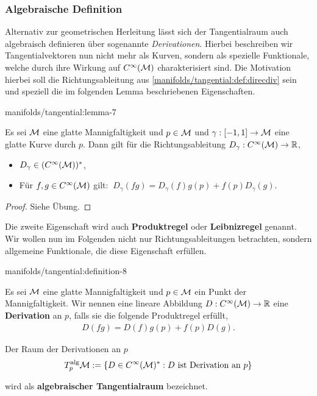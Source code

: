 \subsubsection{Algebraische Definition}
\label{\detokenize{manifolds/tangential:algebraische-definition}}
\par
Alternativ zur geometrischen Herleitung lässt sich der Tangentialraum auch algebraisch definieren über sogenannte \emph{Derivationen}.
Hierbei beschreiben wir Tangentialvektoren nun nicht mehr als Kurven, sondern als spezielle Funktionale, welche durch ihre Wirkung auf \(C^\infty(\mathcal{M})\) charakterisiert sind.
Die Motivation hierbei soll die Richtungsableitung aus \cref{manifolds/tangential:def:direcdiv} sein und speziell die im folgenden Lemma beschriebenen Eigenschaften.
\begin{lemma}{}{manifolds/tangential:lemma-7}



\par
Es sei \(\mathcal{M}\) eine glatte Mannigfaltigkeit und \(p\in\mathcal{M}\) und \(\gamma:[-1,1]\to\mathcal{M}\) eine glatte Kurve durch \(p\).
Dann gilt für die Richtungsableitung \(D_\gamma:C^\infty(\mathcal{M})\to\mathbb{R}\),
\begin{itemize}
\item {} 
\par
\(D_\gamma\in (C^\infty(\mathcal{M}))^\ast\),

\item {} 
\par
Für \(f,g\in C^\infty(\mathcal{M})\) gilt: \(\ D_\gamma(fg) = D_\gamma(f) g(p) + f(p) D_\gamma(g)\).

\end{itemize}
\end{lemma}

\begin{proof}
 Siehe Übung.
\end{proof}

\par
Die zweite Eigenschaft wird auch \textbf{Produktregel} oder \textbf{Leibnizregel} genannt.
Wir wollen nun im Folgenden nicht nur Richtungsableitungen betrachten, sondern allgemeine Funktionale, die diese Eigenschaft erfüllen.
\begin{definition}{}{manifolds/tangential:definition-8}



\par
Es sei \(\mathcal{M}\) eine glatte Mannigfaltigkeit und \(p\in\mathcal{M}\) ein Punkt der Mannigfaltigkeit.
Wir nennen eine lineare Abbildung \(D: C^\infty(\mathcal{M}) \to \mathbb{R}\) eine \textbf{Derivation} an \(p\), falls sie die folgende Produktregel erfüllt,
\begin{align*}
D(fg) = D(f) g(p) + f(p) D(g).
\end{align*}
\par
Der Raum der Derivationen an \(p\)
\begin{align*}
T^{\text{alg}}_p\mathcal{M} := \{D\in C^\infty(\mathcal{M})^\ast: D\text{ ist Derivation an }p\}
\end{align*}
\par
wird als \textbf{algebraischer Tangentialraum} bezeichnet.
\end{definition}

